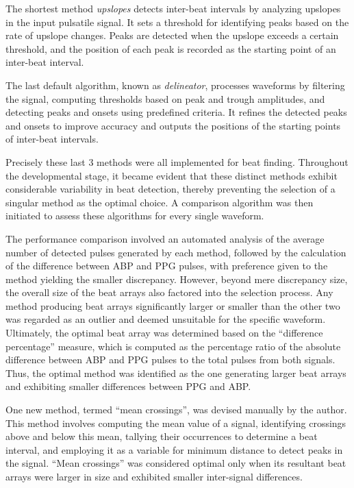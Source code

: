 The shortest method \textit{upslopes} detects inter-beat intervals by analyzing upslopes in the input pulsatile signal.
It sets a threshold for identifying peaks based on the rate of upslope changes.
Peaks are detected when the upslope exceeds a certain threshold, and the position of each peak is recorded as the starting point of an inter-beat interval.

The last default algorithm, known as \textit{delineator}, processes waveforms by filtering the signal, computing thresholds based on peak and trough amplitudes,
and detecting peaks and onsets using predefined criteria.
It refines the detected peaks and onsets to improve accuracy and outputs the positions of the starting points of inter-beat intervals.

Precisely these last 3 methods were all implemented for beat finding.
Throughout the developmental stage, it became evident that these distinct methods exhibit considerable variability in beat detection, thereby preventing the selection of a singular method as the optimal choice.
A comparison algorithm was then initiated to assess these algorithms for every single waveform.

The performance comparison involved an automated analysis of the average number of detected pulses generated by each method, followed by the calculation of the difference between ABP and PPG pulses, with preference given to the method yielding the smaller discrepancy.
However, beyond mere discrepancy size, the overall size of the beat arrays also factored into the selection process.
Any method producing beat arrays significantly larger or smaller than the other two was regarded as an outlier and deemed unsuitable for the specific waveform.
Ultimately, the optimal beat array was determined based on the \enquote{difference percentage} measure, which is computed as the percentage ratio of the absolute difference between ABP and PPG pulses to the total pulses from both signals.
Thus, the optimal method was identified as the one generating larger beat arrays and exhibiting smaller differences between PPG and ABP\@.

One new method, termed \enquote{mean crossings}, was devised manually by the author.
This method involves computing the mean value of a signal, identifying crossings above and below this mean,
tallying their occurrences to determine a beat interval, and employing it as a variable for minimum distance to detect peaks in the signal.
\enquote{Mean crossings} was considered optimal only when its resultant beat arrays were larger in size and exhibited smaller inter-signal differences.

